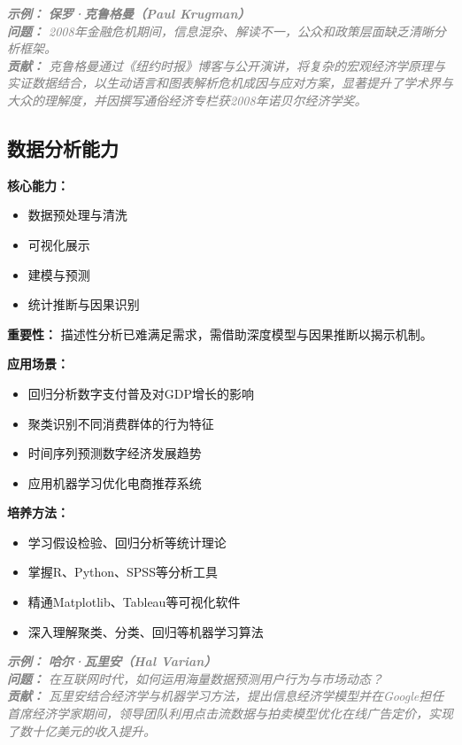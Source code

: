 \documentclass[lang=cn,12pt,a4paper]{elegantpaper}
\newcommand{\skillexample}[1]{\smallskip\noindent\textcolor{gray}{\textit{\footnotesize\textbf{示例：}} \textit{\footnotesize #1}}}
\begin{document}
\skillexample{%
\textbf{保罗·克鲁格曼（Paul Krugman）}\\
\textbf{问题：} 2008年金融危机期间，信息混杂、解读不一，公众和政策层面缺乏清晰分析框架。\\
\textbf{贡献：} 克鲁格曼通过《纽约时报》博客与公开演讲，将复杂的宏观经济学原理与实证数据结合，以生动语言和图表解析危机成因与应对方案，显著提升了学术界与大众的理解度，并因撰写通俗经济专栏获2008年诺贝尔经济学奖。}

\subsection{数据分析能力}\label{sec:data_analysis}
\textbf{核心能力：} 
\begin{itemize}
    \item 数据预处理与清洗
    \item 可视化展示
    \item 建模与预测
    \item 统计推断与因果识别
\end{itemize}

\textbf{重要性：} 描述性分析已难满足需求，需借助深度模型与因果推断以揭示机制。

\textbf{应用场景：} 
\begin{itemize}
    \item 回归分析数字支付普及对GDP增长的影响
    \item 聚类识别不同消费群体的行为特征
    \item 时间序列预测数字经济发展趋势
    \item 应用机器学习优化电商推荐系统
\end{itemize}

\textbf{培养方法：} 
\begin{itemize}
    \item 学习假设检验、回归分析等统计理论
    \item 掌握R、Python、SPSS等分析工具
    \item 精通Matplotlib、Tableau等可视化软件
    \item 深入理解聚类、分类、回归等机器学习算法
\end{itemize}

\skillexample{%
\textbf{哈尔·瓦里安（Hal Varian）}\\
\textbf{问题：} 在互联网时代，如何运用海量数据预测用户行为与市场动态？\\
\textbf{贡献：} 瓦里安结合经济学与机器学习方法，提出信息经济学模型并在Google担任首席经济学家期间，领导团队利用点击流数据与拍卖模型优化在线广告定价，实现了数十亿美元的收入提升。}
\end{document}
